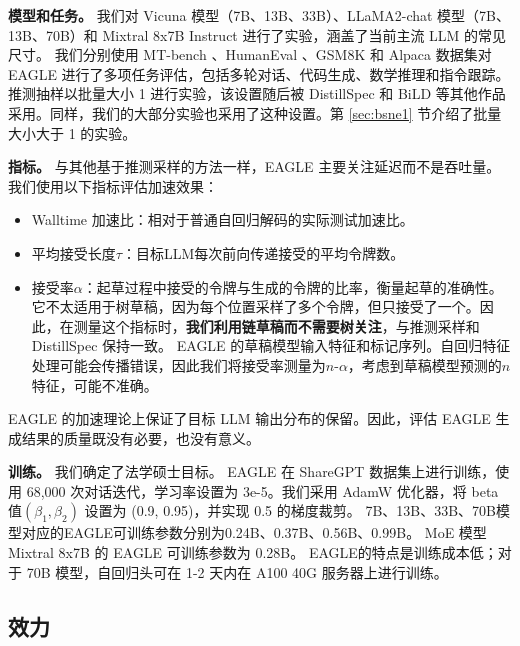 \documentclass{article}
\theoremstyle{plain}
\theoremstyle{definition}
\theoremstyle{remark}
\begin{document}
\textbf{模型和任务。} 我们对 Vicuna 模型（7B、13B、33B）、LLaMA2-chat 模型（7B、13B、70B）和 Mixtral 8x7B Instruct 进行了实验，涵盖了当前主流 LLM 的常见尺寸。
我们分别使用 MT-bench \cite{zheng2023judging}、HumanEval \cite{chen2021evaluating}、GSM8K \cite{cobbe2021training} 和 Alpaca \cite{alpaca} 数据集对 EAGLE 进行了多项任务评估，包括多轮对话、代码生成、数学推理和指令跟踪。
推测抽样\cite{leviathan2023fast}以批量大小 1 进行实验，该设置随后被 DistillSpec \cite{zhou2023distillspec} 和 BiLD \cite{kim2023speculative} 等其他作品采用。同样，我们的大部分实验也采用了这种设置。第 \ref{sec:bsne1} 节介绍了批量大小大于 1 的实验。

\textbf{指标。}
与其他基于推测采样的方法一样，EAGLE 主要关注延迟而不是吞吐量。我们使用以下指标评估加速效果：
\begin{itemize}
 \item Walltime 加速比：相对于普通自回归解码的实际测试加速比。
  \item 平均接受长度$\tau$：目标LLM每次前向传递接受的平均令牌数。
 \item 接受率$\alpha$：起草过程中接受的令牌与生成的令牌的比率，衡量起草的准确性。它不太适用于树草稿，因为每个位置采样了多个令牌，但只接受了一个。因此，在测量这个指标时，\textbf{我们利用链草稿而不需要树关注}，与推测采样和 DistillSpec 保持一致。 EAGLE 的草稿模型输入特征和标记序列。自回归特征处理可能会传播错误，因此我们将接受率测量为$n\text{-}\alpha$，考虑到草稿模型预测的$n$特征，可能不准确。
\end{itemize}

EAGLE 的加速理论上保证了目标 LLM 输出分布的保留。因此，评估 EAGLE 生成结果的质量既没有必要，也没有意义。

\textbf{训练。}
我们确定了法学硕士目标。 EAGLE 在 ShareGPT 数据集上进行训练，使用 68,000 次对话迭代，学习率设置为 3e-5。我们采用 AdamW 优化器，将 beta 值$(\beta_1, \beta_2)$ 设置为 (0.9, 0.95)，并实现 0.5 的梯度裁剪。 
7B、13B、33B、70B模型对应的EAGLE可训练参数分别为0.24B、0.37B、0.56B、0.99B。 MoE 模型 Mixtral 8x7B 的 EAGLE 可训练参数为 0.28B。 EAGLE的特点是训练成本低；对于 70B 模型，自回归头可在 1-2 天内在 A100 40G 服务器上进行训练。



\subsection{效力}

\end{document}

